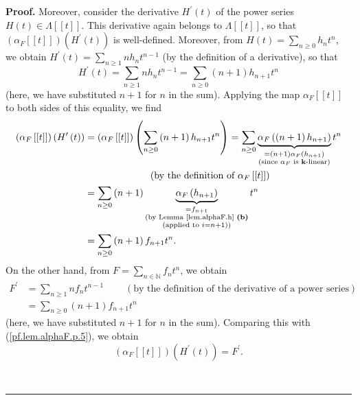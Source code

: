 \documentclass[numbers=enddot,12pt,final,onecolumn,notitlepage]{scrartcl}%
\theoremstyle{definition}
\newenvironment{proof}[1][Proof]{\noindent\textbf{#1.} }{\ \rule{0.5em}{0.5em}}
\let\sumnonlimits\sum
\renewcommand{\sum}{\sumnonlimits\limits}
\newenvironment{verlong}{}{}
\begin{document}
\begin{verlong}
\begin{proof}
Moreover, consider the derivative $H^{\prime}\left(  t\right)  $ of the power
series $H\left(  t\right)  \in\Lambda\left[  \left[  t\right]  \right]  $.
This derivative again belongs to $\Lambda\left[  \left[  t\right]  \right]  $,
so that $\left(  \alpha_{F}\left[  \left[  t\right]  \right]  \right)  \left(
H^{\prime}\left(  t\right)  \right)  $ is well-defined. Moreover, from
$H\left(  t\right)  =\sum_{n\geq0}h_{n}t^{n}$, we obtain $H^{\prime}\left(
t\right)  =\sum_{n\geq1}nh_{n}t^{n-1}$ (by the definition of a derivative), so
that%
\[
H^{\prime}\left(  t\right)  =\sum_{n\geq1}nh_{n}t^{n-1}=\sum_{n\geq0}\left(
n+1\right)  h_{n+1}t^{n}%
\]
(here, we have substituted $n+1$ for $n$ in the sum). Applying the map
$\alpha_{F}\left[  \left[  t\right]  \right]  $ to both sides of this
equality, we find%
\begin{align}
\left(  \alpha_{F}\left[  \left[  t\right]  \right]  \right)  \left(
H^{\prime}\left(  t\right)  \right)   &  =\left(  \alpha_{F}\left[  \left[
t\right]  \right]  \right)  \left(  \sum_{n\geq0}\left(  n+1\right)
h_{n+1}t^{n}\right)  =\sum_{n\geq0}\underbrace{\alpha_{F}\left(  \left(
n+1\right)  h_{n+1}\right)  }_{\substack{=\left(  n+1\right)  \alpha
_{F}\left(  h_{n+1}\right)  \\\text{(since }\alpha_{F}\text{ is }%
\mathbf{k}\text{-linear)}}}t^{n}\nonumber\\
&  \ \ \ \ \ \ \ \ \ \ \ \ \ \ \ \ \ \ \ \ \left(  \text{by the definition of
}\alpha_{F}\left[  \left[  t\right]  \right]  \right) \nonumber\\
&  =\sum_{n\geq0}\left(  n+1\right)  \underbrace{\alpha_{F}\left(
h_{n+1}\right)  }_{\substack{=f_{n+1}\\\text{(by Lemma \ref{lem.alphaF.h}
\textbf{(b)}}\\\text{(applied to }i=n+1\text{))}}}t^{n}\nonumber\\
&  =\sum_{n\geq0}\left(  n+1\right)  f_{n+1}t^{n}. \label{pf.lem.alphaF.p.5}%
\end{align}
On the other hand, from $F=\sum_{n\in\mathbb{N}}f_{n}t^{n}$, we obtain
\begin{align*}
F^{\prime}  &  =\sum_{n\geq1}nf_{n}t^{n-1}\ \ \ \ \ \ \ \ \ \ \left(  \text{by
the definition of the derivative of a power series}\right) \\
&  =\sum_{n\geq0}\left(  n+1\right)  f_{n+1}t^{n}%
\end{align*}
(here, we have substituted $n+1$ for $n$ in the sum). Comparing this with
(\ref{pf.lem.alphaF.p.5}), we obtain
\[
\left(  \alpha_{F}\left[  \left[  t\right]  \right]  \right)  \left(
H^{\prime}\left(  t\right)  \right)  =F^{\prime}.
\]



\end{proof}
\end{verlong}
\end{document}
